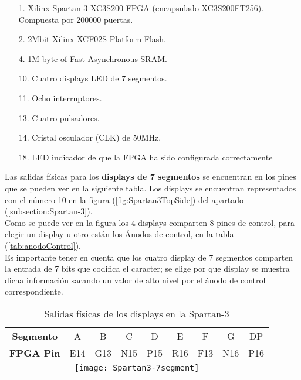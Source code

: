     \begin{itemize}
        \item [1.] Xilinx Spartan-3 XC3S200 FPGA  (encapsulado XC3S200FT256). Compuesta por 200000 puertas.
        \item [2.] 2Mbit Xilinx XCF02S Platform Flash.
        \item [4.] 1M-byte of Fast Asynchronous SRAM.
        \item [10.] Cuatro displays LED de 7 segmentos.
        \item [11.] Ocho interruptores.
        \item [13.] Cuatro pulsadores.
        \item [14.] Cristal osculador (CLK) de 50MHz.
        \item [18.] LED indicador de que la FPGA ha sido configurada correctamente

    \end{itemize}

    Las salidas físicas para los \textbf{displays de 7 segmentos} se encuentran en los pines que se pueden ver en la siguiente tabla. Los displays se encuentran representados con el número 10 en la figura (\ref{fig:Spartan3TopSide}) del apartado (\ref{subsection:Spartan-3}). \\ 

    Como se puede ver en la figura los 4 displays comparten 8 pines de control, para elegir un display u otro están los Ánodos de control, en la tabla (\ref{tab:anodoControl}). \\ 

    Es importante tener en cuenta que los cuatro display de 7 segmentos comparten la entrada de 7 bits que codifica el caracter; se elige por que display se muestra dicha información sacando un valor de alto nivel por el ánodo de control correspondiente. \\ 

    \begin{table}[H]
            \centering
            \begin{tabular}{|c|c|c|c|c|c|c|c|c|}
                \hline
                \rowcolor[rgb]{0.21,0.69,0.87}\multicolumn{9}{|c|}{  \textbf{ {Salidas físicas Display 7 segmentos}}} \\
                \hline \hline
                \textbf{  Segmento  } & A & B & C & D & E & F & G & DP \\ 
                \hline
                \textbf{  FPGA Pin  }  & E14 & G13 & N15 & P15 & R16 & F13 & N16 & P16 \\ 
                \hline
                \multicolumn{9}{|c|}{\texttt{[image: Spartan3-7segment]}}\\
                \hline
                 
            \end{tabular}
        \caption{ Salidas físicas de los displays en la Spartan-3 }
        \label{tab:tablaSalidas7Segmentos}
    \end{table}

